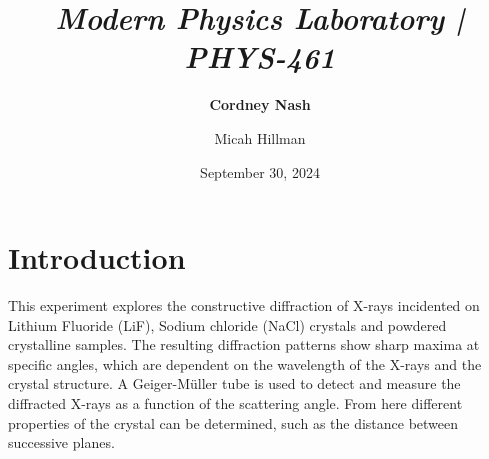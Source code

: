 \documentclass[a4paper,12pt,english]{all-in-one} %
\title{{\large\textit{Modern Physics Laboratory | PHYS-461}}\\[0.5cm]{\Huge\color{gray}\textsc{\@docsubtitle}}}
\author{\textbf{Cordney Nash}  \and Micah Hillman  }
\date{September 30, 2024}
\newcommand\tab[1][1cm]{\hspace*{#1}}
\begin{document}
\begin{titlepage}
\maketitle\vfill
\end{titlepage}
\newpage


\section*{Introduction}
{
\tab This experiment explores the constructive diffraction of X-rays incidented on Lithium Fluoride (LiF), Sodium chloride (NaCl) crystals and powdered crystalline samples. The resulting diffraction patterns show sharp maxima at specific angles, which are dependent on the wavelength of the X-rays and the crystal structure. A Geiger-Müller tube is used to detect and measure the diffracted X-rays as a function of the scattering angle. From here different properties of the crystal can be determined, such as the distance between successive planes.
}
\end{document}
